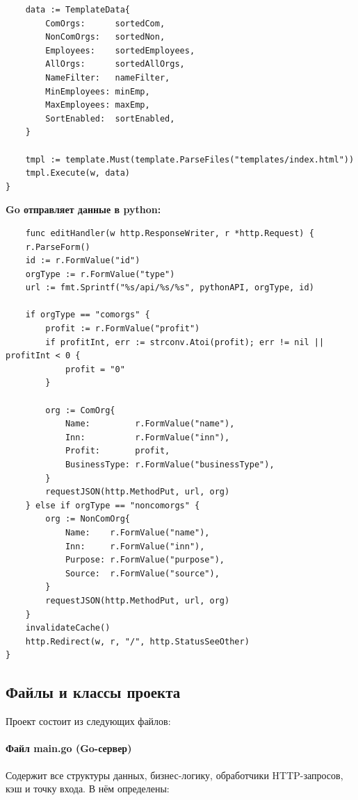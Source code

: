 \documentclass[oneside,a4paper,14pt]{extarticle}
\begin{document}
\begin{small}
\begin{verbatim}
	data := TemplateData{
		ComOrgs:      sortedCom,
		NonComOrgs:   sortedNon,
		Employees:    sortedEmployees,
		AllOrgs:      sortedAllOrgs,
		NameFilter:   nameFilter,
		MinEmployees: minEmp,
		MaxEmployees: maxEmp,
		SortEnabled:  sortEnabled,
	}

	tmpl := template.Must(template.ParseFiles("templates/index.html"))
	tmpl.Execute(w, data)
}
\end{verbatim}

\end{small}

\newpage

\textbf{Go отправляет данные в python:}
\begin{small}

\begin{verbatim}
    func editHandler(w http.ResponseWriter, r *http.Request) {
	r.ParseForm()
	id := r.FormValue("id")
	orgType := r.FormValue("type")
	url := fmt.Sprintf("%s/api/%s/%s", pythonAPI, orgType, id)

	if orgType == "comorgs" {
		profit := r.FormValue("profit")
		if profitInt, err := strconv.Atoi(profit); err != nil || profitInt < 0 {
			profit = "0"
		}

		org := ComOrg{
			Name:         r.FormValue("name"),
			Inn:          r.FormValue("inn"),
			Profit:       profit,
			BusinessType: r.FormValue("businessType"),
		}
		requestJSON(http.MethodPut, url, org)
	} else if orgType == "noncomorgs" {
		org := NonComOrg{
			Name:    r.FormValue("name"),
			Inn:     r.FormValue("inn"),
			Purpose: r.FormValue("purpose"),
			Source:  r.FormValue("source"),
		}
		requestJSON(http.MethodPut, url, org)
	}
	invalidateCache()
	http.Redirect(w, r, "/", http.StatusSeeOther)
}
\end{verbatim}
\end{small}

\newpage
\subsection*{Файлы и классы проекта}

Проект состоит из следующих файлов:

\paragraph{Файл main.go (Go-сервер)}
Содержит все структуры данных, бизнес-логику, обработчики HTTP-запросов, кэш и точку входа. В нём определены:
\end{document}
